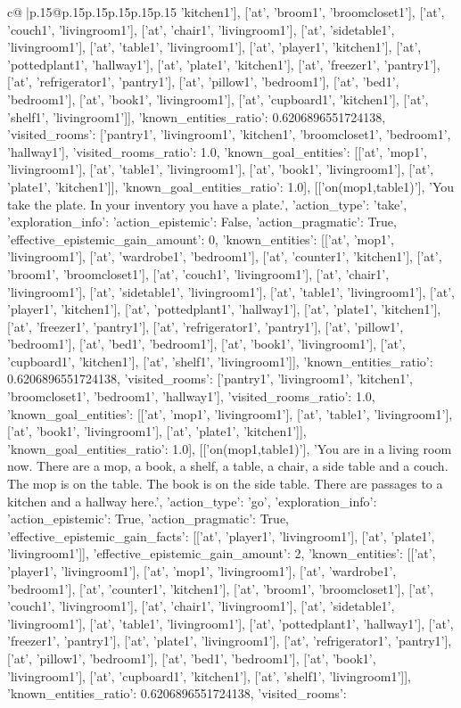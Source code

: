 \documentclass{article}
\begin{document}
{\begin{supertabular}{c@{$\;$}|p{.15\linewidth}@{}p{.15\linewidth}p{.15\linewidth}p{.15\linewidth}p{.15\linewidth}p{.15\linewidth}}
{{{'kitchen1'], ['at', 'broom1', 'broomcloset1'], ['at', 'couch1', 'livingroom1'], ['at', 'chair1', 'livingroom1'], ['at', 'sidetable1', 'livingroom1'], ['at', 'table1', 'livingroom1'], ['at', 'player1', 'kitchen1'], ['at', 'pottedplant1', 'hallway1'], ['at', 'plate1', 'kitchen1'], ['at', 'freezer1', 'pantry1'], ['at', 'refrigerator1', 'pantry1'], ['at', 'pillow1', 'bedroom1'], ['at', 'bed1', 'bedroom1'], ['at', 'book1', 'livingroom1'], ['at', 'cupboard1', 'kitchen1'], ['at', 'shelf1', 'livingroom1']], 'known_entities_ratio': 0.6206896551724138, 'visited_rooms': ['pantry1', 'livingroom1', 'kitchen1', 'broomcloset1', 'bedroom1', 'hallway1'], 'visited_rooms_ratio': 1.0, 'known_goal_entities': [['at', 'mop1', 'livingroom1'], ['at', 'table1', 'livingroom1'], ['at', 'book1', 'livingroom1'], ['at', 'plate1', 'kitchen1']], 'known_goal_entities_ratio': 1.0}}], [['on(mop1,table1)'], 'You take the plate. In your inventory you have a plate.', {'action_type': 'take', 'exploration_info': {'action_epistemic': False, 'action_pragmatic': True, 'effective_epistemic_gain_amount': 0, 'known_entities': [['at', 'mop1', 'livingroom1'], ['at', 'wardrobe1', 'bedroom1'], ['at', 'counter1', 'kitchen1'], ['at', 'broom1', 'broomcloset1'], ['at', 'couch1', 'livingroom1'], ['at', 'chair1', 'livingroom1'], ['at', 'sidetable1', 'livingroom1'], ['at', 'table1', 'livingroom1'], ['at', 'player1', 'kitchen1'], ['at', 'pottedplant1', 'hallway1'], ['at', 'plate1', 'kitchen1'], ['at', 'freezer1', 'pantry1'], ['at', 'refrigerator1', 'pantry1'], ['at', 'pillow1', 'bedroom1'], ['at', 'bed1', 'bedroom1'], ['at', 'book1', 'livingroom1'], ['at', 'cupboard1', 'kitchen1'], ['at', 'shelf1', 'livingroom1']], 'known_entities_ratio': 0.6206896551724138, 'visited_rooms': ['pantry1', 'livingroom1', 'kitchen1', 'broomcloset1', 'bedroom1', 'hallway1'], 'visited_rooms_ratio': 1.0, 'known_goal_entities': [['at', 'mop1', 'livingroom1'], ['at', 'table1', 'livingroom1'], ['at', 'book1', 'livingroom1'], ['at', 'plate1', 'kitchen1']], 'known_goal_entities_ratio': 1.0}}], [['on(mop1,table1)'], 'You are in a living room now. There are a mop, a book, a shelf, a table, a chair, a side table and a couch. The mop is on the table. The book is on the side table. There are passages to a kitchen and a hallway here.', {'action_type': 'go', 'exploration_info': {'action_epistemic': True, 'action_pragmatic': True, 'effective_epistemic_gain_facts': [['at', 'player1', 'livingroom1'], ['at', 'plate1', 'livingroom1']], 'effective_epistemic_gain_amount': 2, 'known_entities': [['at', 'player1', 'livingroom1'], ['at', 'mop1', 'livingroom1'], ['at', 'wardrobe1', 'bedroom1'], ['at', 'counter1', 'kitchen1'], ['at', 'broom1', 'broomcloset1'], ['at', 'couch1', 'livingroom1'], ['at', 'chair1', 'livingroom1'], ['at', 'sidetable1', 'livingroom1'], ['at', 'table1', 'livingroom1'], ['at', 'pottedplant1', 'hallway1'], ['at', 'freezer1', 'pantry1'], ['at', 'plate1', 'livingroom1'], ['at', 'refrigerator1', 'pantry1'], ['at', 'pillow1', 'bedroom1'], ['at', 'bed1', 'bedroom1'], ['at', 'book1', 'livingroom1'], ['at', 'cupboard1', 'kitchen1'], ['at', 'shelf1', 'livingroom1']], 'known_entities_ratio': 0.6206896551724138, 'visited_rooms': }}}
\end{supertabular}}
\end{document}
